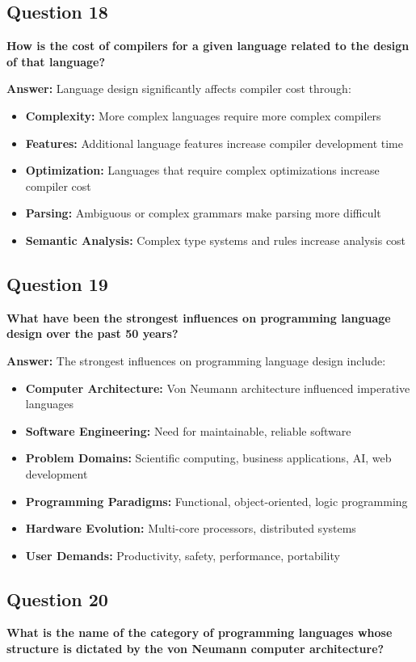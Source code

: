 \documentclass[11pt,a4paper]{article}
\begin{document}
\subsection{Question 18}
\textbf{How is the cost of compilers for a given language related to the design of that language?}

\textbf{Answer:}
Language design significantly affects compiler cost through:

\begin{itemize}
\item \textbf{Complexity:} More complex languages require more complex compilers
\item \textbf{Features:} Additional language features increase compiler development time
\item \textbf{Optimization:} Languages that require complex optimizations increase compiler cost
\item \textbf{Parsing:} Ambiguous or complex grammars make parsing more difficult
\item \textbf{Semantic Analysis:} Complex type systems and rules increase analysis cost
\end{itemize}

\subsection{Question 19}
\textbf{What have been the strongest influences on programming language design over the past 50 years?}

\textbf{Answer:}
The strongest influences on programming language design include:

\begin{itemize}
\item \textbf{Computer Architecture:} Von Neumann architecture influenced imperative languages
\item \textbf{Software Engineering:} Need for maintainable, reliable software
\item \textbf{Problem Domains:} Scientific computing, business applications, AI, web development
\item \textbf{Programming Paradigms:} Functional, object-oriented, logic programming
\item \textbf{Hardware Evolution:} Multi-core processors, distributed systems
\item \textbf{User Demands:} Productivity, safety, performance, portability
\end{itemize}

\subsection{Question 20}
\textbf{What is the name of the category of programming languages whose structure is dictated by the von Neumann computer architecture?}
\end{document}
